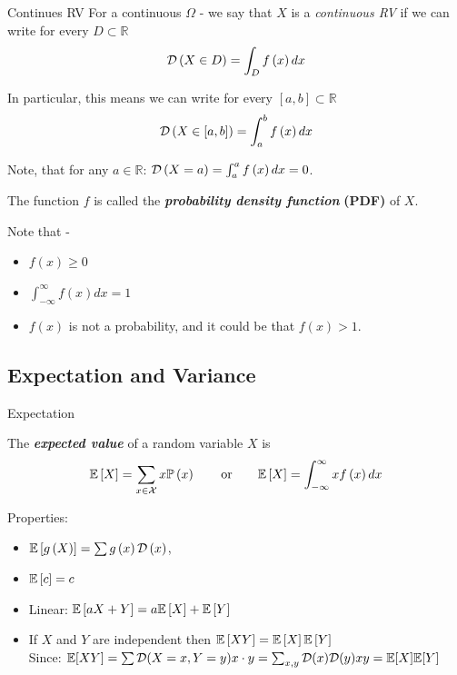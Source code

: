 \documentclass[11pt, usenames, dvipsnames]{beamer}
\begin{document}
\begin{frame}{Continues RV}
For a continuous $\Omega$ - we say that $X$ is a \textit{continuous
RV} if we can write for every $D\subset\mathbb{R}$ 
\[
\mathcal{D}\left(X\in D\right)=\int_{D}f\left(x\right)dx
\]
\pause

In particular, this means we can write for every $\left[a,b\right]\subset\mathbb{R}$
\[
\mathcal{D}\left(X\in\left[a,b\right]\right)=\int_{a}^{b}f\left(x\right)dx
\]

\pause

Note, that for any $a\in\mathbb{R}$:  $\mathcal{D}\left(X=a\right)=\int_{a}^{a}f\left(x\right)dx=0$.

\pause

The function $f$ is called the \textbf{\textit{probability density
function }}\textbf{(PDF)} of $X$. 

\pause

Note that - 
\begin{itemize}
\item $f\left(x\right)\ge0$
\item $\int_{-\infty}^{\infty}f\left(x\right)dx=1$ 
\item $f\left(x\right)$ is not a probability, and it could be that $f\left(x\right)>1$.\\
\end{itemize}

\end{frame}

\subsection{Expectation and Variance}
\begin{frame}{Expectation}
\begin{definition}[Expectation]
The \textbf{\textit{expected value}} of a random variable
$X$ is
\[
\mathbb{E}\left[X\right]=\sum_{x\in\mathcal{X}}x\mathbb{P}\left(x\right)\qquad\mbox{or}\qquad \mathbb{E}\left[X\right]=\int_{-\infty}^{\infty}xf\left(x\right)dx
\]
\end{definition}

\pause

Properties:
\begin{itemize}
\item $\mathbb{E}\left[g\left(X\right)\right]=\sum g\left(x\right)\mathcal{D}\left(x\right)$,
\pause
\item $\mathbb{E}\left[c\right]=c$
\pause
\item Linear: $\mathbb{E}\left[aX+Y\right]=a\mathbb{E}\left[X\right]+\mathbb{E}\left[Y\right]$
\pause
\item If $X$ and $Y$ are independent then $\mathbb{E}\left[XY\right]=\mathbb{E}\left[X\right]\mathbb{E}\left[Y\right]$\\
Since: $\mathbb{E}[XY]=\sum\mathcal{D}(X=x,Y=y)x\cdot y = \sum_{x,y}\mathcal{D}(x)\mathcal{D}(y)xy=\mathbb{E}[X]\mathbb{E}[Y]$
\end{itemize}
    
\end{frame}
\end{document}
